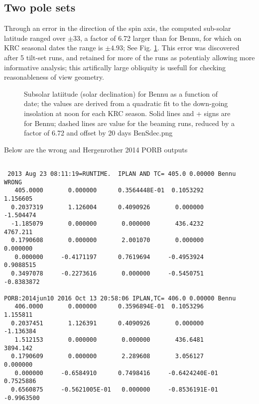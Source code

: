 \documentclass{article}
\begin{document}
\subsection{Two pole sets}

Through an error in the direction of the spin axis, the computed sub-solar
latitude ranged over $\pm 33$\qd, a factor of 6.72 larger than for Bennu, for
which on KRC seasonal dates the range is $\pm 4.93$\qd; See
Fig. \ref{BenSdec}. This error was discovered after 5 tilt-set runs, and
retained for more of the runs as potentialy allowing more informative
analysis; this artifically large obliquity is usefull for checking reasonableness of view geometry. 

\begin{figure}[!ht] 
\caption[Sub-solar latitude]{Subsolar latiitude (solar declination) for Bennu as
  a function of date; the values are derived from a quadratic fit to the
  down-going insolation at noon for each KRC season.  Solid lines and + signs
  are for Bennu; dashed lines are value for the beaming runs, reduced by a
  factor of 6.72 and offset by 20 days
\label{BenSdec}  BenSdec.png  }
\end{figure} 

Below are the wrong and Hergenrother 2014 PORB outputs
\vspace{-3.mm} 
\begin{verbatim}
    
 2013 Aug 23 08:11:19=RUNTIME.  IPLAN AND TC= 405.0 0.00000 Bennu   WRONG   
   405.0000       0.000000      0.3564448E-01  0.1053292       1.156605    
  0.2037319       1.126004      0.4090926       0.000000      -1.504474    
  -1.185079       0.000000       0.000000       436.4232       4767.211    
  0.1790608       0.000000       2.001070       0.000000       0.000000    
   0.000000     -0.4171197      0.7619694     -0.4953924      0.9088515    
  0.3497078     -0.2273616       0.000000     -0.5450751     -0.8383872  

PORB:2014jun10 2016 Oct 13 20:58:06 IPLAN,TC= 406.0 0.00000 Bennu
   406.0000       0.000000      0.3596894E-01  0.1053296       1.155811    
  0.2037451       1.126391      0.4090926       0.000000      -1.136384    
   1.512153       0.000000       0.000000       436.6481       3894.142    
  0.1790609       0.000000       2.289608       3.056127       0.000000    
   0.000000     -0.6584910      0.7498416     -0.6424240E-01  0.7525886    
  0.6560875     -0.5621005E-01   0.000000     -0.8536191E-01 -0.9963500
\end{verbatim} 
\end{document}
